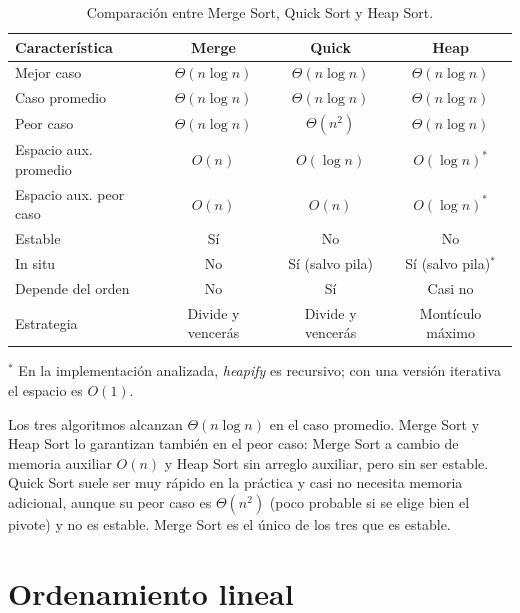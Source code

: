 \documentclass[11pt,letterpaper]{article}
\begin{document}
\begin{table}[htbp]
  \centering
  \caption{Comparación entre Merge Sort, Quick Sort y Heap Sort.}
  \begin{tabular}{lccc}
    \toprule
    \textbf{Característica} & \textbf{Merge} & \textbf{Quick} & \textbf{Heap} \\
    \midrule
    Mejor caso             & $\Theta(n \log n)$ & $\Theta(n \log n)$ & $\Theta(n \log n)$ \\
    Caso promedio          & $\Theta(n \log n)$ & $\Theta(n \log n)$ & $\Theta(n \log n)$ \\
    Peor caso              & $\Theta(n \log n)$ & $\Theta(n^2)$      & $\Theta(n \log n)$ \\
    Espacio aux. promedio  & $O(n)$             & $O(\log n)$        & $O(\log n)^{*}$ \\
    Espacio aux. peor caso & $O(n)$             & $O(n)$             & $O(\log n)^{*}$ \\
    Estable                & Sí                 & No                 & No \\
    In situ                & No                 & Sí (salvo pila)    & Sí (salvo pila)$^{*}$ \\
    Depende del orden      & No                 & Sí                 & Casi no \\
    Estrategia             & Divide y vencerás  & Divide y vencerás  & Montículo máximo \\
    \bottomrule
  \end{tabular}

  \smallskip
  {\footnotesize $^{*}$ En la implementación analizada, \emph{heapify} es recursivo; con una versión iterativa el espacio es $O(1)$.}
\end{table}

Los tres algoritmos alcanzan $\Theta(n \log n)$ en el caso promedio. Merge Sort y Heap Sort lo garantizan también en el peor caso: Merge Sort a cambio de memoria auxiliar $O(n)$ y Heap Sort sin arreglo auxiliar, pero sin ser estable. Quick Sort suele ser muy rápido en la práctica y casi no necesita memoria adicional, aunque su peor caso es $\Theta(n^2)$ (poco probable si se elige bien el pivote) y no es estable. Merge Sort es el único de los tres que es estable.

\clearpage

\section{Ordenamiento lineal}
\end{document}
